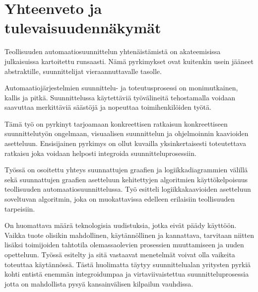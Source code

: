 \documentclass[finnish,12pt]{article}
\begin{document}





	\clearpage

	\section{Yhteenveto ja tulevaisuudennäkymät}

Teollisuuden automaatiosuunnittelun yhtenäistämistä on akateemisissa julkaisuissa kartoitettu runsaasti.
Nämä pyrkimykset ovat kuitenkin usein jääneet abstraktille, suunnittelijat vieraannuttavalle tasolle.

Automaatiojärjestelmien suunnittelu- ja toteutusprosessi on monimutkainen, kallis ja pitkä.
Suunnittelussa käytettäviä työvälineitä tehostamalla voidaan saavuttaa merkittäviä säästöjä ja nopeuttaa toimihenkilöiden työtä.

Tämä työ on pyrkinyt tarjoamaan konkreettisen ratkaisun konkreettiseen suunnittelutyön ongelmaan, visuaalisen suunnittelun ja ohjelmoinnin kaavioiden asetteluun.
Ensisijainen pyrkimys on ollut kuvailla yksinkertaisesti toteutettava ratkaisu joka voidaan helposti integroida suunnitteluprosessiin.

Työssä on osoitettu yhteys suunnattujen graafien ja logiikkadiagrammien välillä sekä suunnattujen graafien asetteluun kehitettyjen algoritmien käyttökelpoisuus teollisuuden automaatiosuunnittelussa.
Työ esitteli logiikkakaavioiden asetteluun soveltuvan algoritmin, joka on muokattavissa edelleen erilaisiin teollisuuden tarpeisiin.

On huomattava määrä teknologisia uudistuksia, jotka eivät päädy käyttöön.
Vaikka tuote olisikin mahdollinen, käytännöllinen ja kannattava, tarvitaan niitten lisäksi toimijoiden tahtotila olemassaolevien prosessien muuttamiseen ja uuden opetteluun.
Työssä esitelty ja sitä vastaavat menetelmät voivat olla vaikeita toteuttaa käytännössä.
Tästä huolimatta täytyy suunnittelualan yritysten pyrkiä kohti entistä enemmän integroidumpaa ja virtaviivaistettua suunnitteluprosessia jotta on mahdollista pysyä kansainvälisen kilpailun vauhdissa.

\clearpage
{}


\end{document}
